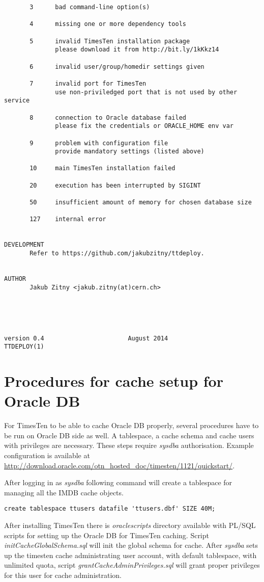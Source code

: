 \documentclass[11pt, letterpaper]{article}
\begin{document}
\begin{lstlisting}
       3      bad command-line option(s)

       4      missing one or more dependency tools

       5      invalid TimesTen installation package
              please download it from http://bit.ly/1kKkz14

       6      invalid user/group/homedir settings given

       7      invalid port for TimesTen
              use non-priviledged port that is not used by other service

       8      connection to Oracle database failed
              please fix the credentials or ORACLE_HOME env var

       9      problem with configuration file
              provide mandatory settings (listed above)

       10     main TimesTen installation failed

       20     execution has been interrupted by SIGINT

       50     insufficient amount of memory for chosen database size

       127    internal error


DEVELOPMENT
       Refer to https://github.com/jakubzitny/ttdeploy.


AUTHOR
       Jakub Zitny <jakub.zitny(at)cern.ch>





version 0.4                       August 2014                      TTDEPLOY(1)
\end{lstlisting}

\section{Procedures for cache setup for Oracle DB}

For TimesTen to be able to cache Oracle DB properly, several procedures have to be run on Oracle DB side as well. A tablespace, a cache schema and cache users with privileges are necessary. These steps require \emph{sysdba} authorisation. Example configuration is available at \url{http://download.oracle.com/otn_hosted_doc/timesten/1121/quickstart/}.

After logging in as \emph{sysdba} following command will create a tablespace for managing all the IMDB cache objects.

\begin{lstlisting}
create tablespace ttusers datafile 'ttusers.dbf' SIZE 40M;
\end{lstlisting}

After installing TimesTen there is \emph{oraclescripts} directory available with PL/SQL scripts for setting up the Oracle DB for TimesTen caching. Script \emph{initCacheGlobalSchema.sql} will init the global schema for cache. After \emph{sysdba} sets up the timesten cache administrating user account, with default tablespace, with unlimited quota, script \emph{grantCacheAdminPrivileges.sql} will grant proper privileges for this user for cache administration.

\newpage


{}
\end{document}
